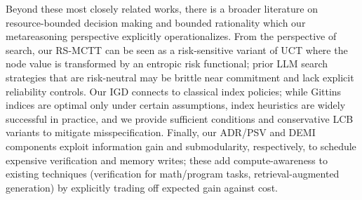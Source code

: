 Beyond these most closely related works, there is a broader literature on resource-bounded decision making and bounded rationality which our metareasoning perspective explicitly operationalizes. From the perspective of search, our RS-MCTT can be seen as a risk-sensitive variant of UCT \cite{kocsis2006uct} where the node value is transformed by an entropic risk functional; prior LLM search strategies that are risk-neutral may be brittle near commitment and lack explicit reliability controls. Our IGD connects to classical index policies; while Gittins indices are optimal only under certain assumptions, index heuristics are widely successful in practice, and we provide sufficient conditions and conservative LCB variants to mitigate misspecification. Finally, our ADR/PSV and DEMI components exploit information gain and submodularity, respectively, to schedule expensive verification and memory writes; these add compute-awareness to existing techniques (verification for math/program tasks, retrieval-augmented generation) by explicitly trading off expected gain against cost.

